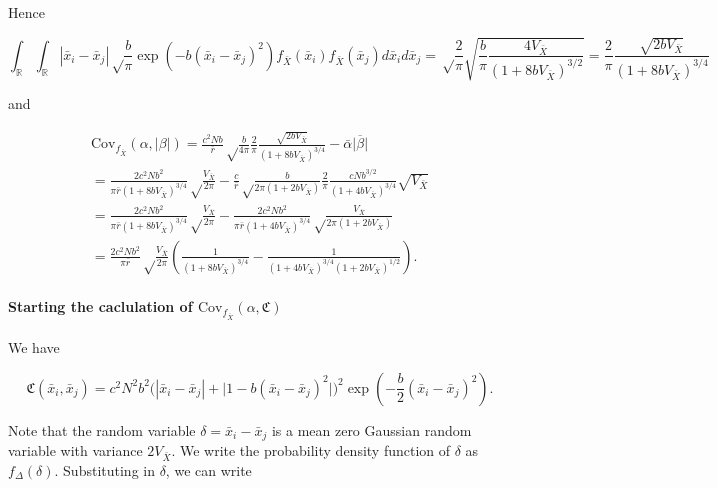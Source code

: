 \documentclass[]{article}
\let\oldparagraph\paragraph
\renewcommand{\paragraph}[1]{\oldparagraph{#1}\mbox{}}
\begin{document}
Hence

\begin{equation}
\int_\mathbb{R}\int_\mathbb{R}|\bar x_i-\bar x_j|\sqrt\frac{b}{\pi}\exp\left(-b(\bar x_i-\bar x_j)^2\right)f_{\bar X}(\bar x_i)f_{\bar X}(\bar x_j)d\bar x_id\bar x_j=\sqrt\frac{2}{\pi}\sqrt{\frac{b}{\pi}\frac{4V_{\bar X}}{(1+8bV_{\bar X})^{3/2}}}=\frac{2}{\pi}\frac{\sqrt{2bV_{\bar X}}}{(1+8bV_{\bar X})^{3/4}}
\end{equation}

and

\begin{multline}
\mathrm{Cov}_{f_{\bar X}}(\alpha,|\beta|)=\frac{c^2Nb}{\bar r}\sqrt\frac{b}{4\pi}\frac{2}{\pi}\frac{\sqrt{2bV_{\bar X}}}{(1+8bV_{\bar X})^{3/4}}-\bar\alpha\overline{|\beta|} \\
=\frac{2c^2Nb^2}{\pi\bar r(1+8bV_{\bar X})^{3/4}}\sqrt\frac{V_{\bar X}}{2\pi}-\frac{c}{\bar r}\sqrt\frac{b}{2\pi(1+2bV_{\bar X})}\frac{2}{\pi}\frac{cNb^{3/2}}{(1+4bV_{\bar X})^{3/4}}\sqrt{V_{\bar X}} \\
=\frac{2c^2Nb^2}{\pi\bar r(1+8bV_{\bar X})^{3/4}}\sqrt\frac{V_{\bar X}}{2\pi}-\frac{2c^2Nb^2}{\pi\bar r(1+4bV_{\bar X})^{3/4}}\sqrt\frac{V_{\bar X}}{2\pi(1+2bV_{\bar X})} \\
=\frac{2c^2Nb^2}{\pi\bar r}\sqrt\frac{V_{\bar X}}{2\pi}\left(\frac{1}{(1+8bV_{\bar X})^{3/4}}-\frac{1}{(1+4bV_{\bar X})^{3/4}(1+2bV_{\bar X})^{1/2}}\right).
\end{multline}

\hypertarget{starting-the-caclulation-of-mathrmcov_f_bar-xalphamathfrakc}{%
\paragraph{\texorpdfstring{Starting the caclulation of
\(\mathrm{Cov}_{f_{\bar X}}(\alpha,\mathfrak{C})\)
\label{caC}}{Starting the caclulation of \textbackslash{}mathrm\{Cov\}\_\{f\_\{\textbackslash{}bar X\}\}(\textbackslash{}alpha,\textbackslash{}mathfrak\{C\}) }}\label{starting-the-caclulation-of-mathrmcov_f_bar-xalphamathfrakc}}

We have

\begin{equation}
\mathfrak{C}(\bar x_i,\bar x_j)=c^2N^2b^2\Big(|\bar x_i-\bar x_j|+\big|1-b(\bar x_i-\bar x_j)^2\big|\Big)^2\exp\left(-\frac{b}{2}(\bar x_i-\bar x_j)^2\right).
\end{equation}

Note that the random variable \(\delta=\bar x_i-\bar x_j\) is a mean
zero Gaussian random variable with variance \(2V_{\bar X}\). We write
the probability density function of \(\delta\) as
\(f_{\Delta}(\delta)\). Substituting in \(\delta\), we can write
\end{document}
